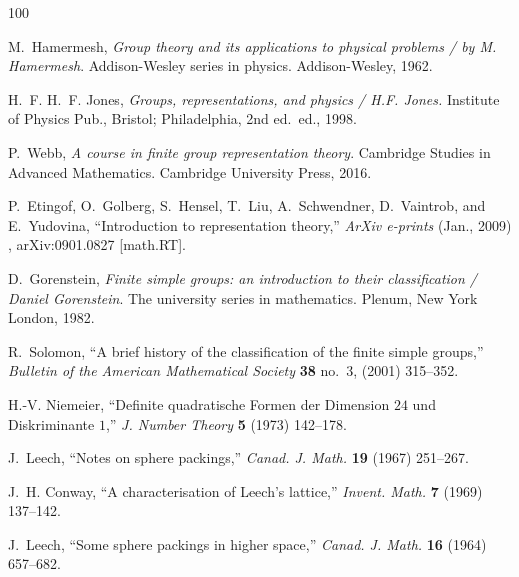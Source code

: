 \providecommand{\href}[2]{#2}\begingroup\raggedright\begin{thebibliography}{100}

M.~Hamermesh, {\em Group theory and its applications to physical problems / by
  M. Hamermesh}.
\newblock Addison-Wesley series in physics. Addison-Wesley, 1962.

H.~F. H.~F. Jones, {\em Groups, representations, and physics / H.F. Jones.}
\newblock Institute of Physics Pub., Bristol; Philadelphia, 2nd ed.~ed., 1998.

P.~Webb, \href{http://dx.doi.org/10.1017/CBO9781316677216}{{\em A course in
  finite group representation theory}}.
\newblock Cambridge Studies in Advanced Mathematics. Cambridge University
  Press, 2016.

P.~{Etingof}, O.~{Golberg}, S.~{Hensel}, T.~{Liu}, A.~{Schwendner},
  D.~{Vaintrob}, and E.~{Yudovina}, ``{Introduction to representation
  theory},'' {\em ArXiv e-prints} (Jan., 2009) ,
  \href{http://arxiv.org/abs/0901.0827}{{\ttfamily arXiv:0901.0827 [math.RT]}}.

D.~Gorenstein, {\em Finite simple groups: an introduction to their
  classification / Daniel Gorenstein}.
\newblock The university series in mathematics. Plenum, New York London, 1982.

R.~Solomon, ``A brief history of the classification of the finite simple
  groups,'' {\em Bulletin of the American Mathematical Society} {\bfseries 38}
  no.~3, (2001) 315--352.

H.-V. Niemeier, ``Definite quadratische {F}ormen der {D}imension {$24$} und
  {D}iskriminante {$1$},'' {\em J. Number Theory} {\bfseries 5} (1973)
  142--178.

J.~Leech, ``Notes on sphere packings,'' {\em Canad. J. Math.} {\bfseries 19}
  (1967) 251--267.

J.~H. Conway, ``A characterisation of {L}eech's lattice,'' {\em Invent. Math.}
  {\bfseries 7} (1969) 137--142.

J.~Leech, ``Some sphere packings in higher space,'' {\em Canad. J. Math.}
  {\bfseries 16} (1964) 657--682.


\end{thebibliography}
